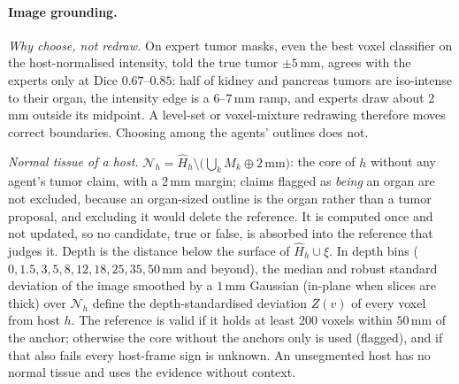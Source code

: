 \documentclass[fleqn,10pt]{olplainarticle}
\begin{document}
\paragraph{Image grounding.}
\label{sec:grounding_details}
\emph{Why choose, not redraw.} On expert tumor masks, even the best voxel classifier on the host-normalised intensity, told
the true tumor $\pm5$\,mm, agrees with the experts only at Dice $0.67$--$0.85$: half of kidney and pancreas tumors are
iso-intense to their organ, the intensity edge is a $6$--$7$\,mm ramp, and experts draw about $2$\,mm outside its midpoint.
A level-set or voxel-mixture redrawing therefore moves correct boundaries. Choosing among the agents' outlines does not.

\emph{Normal tissue of a host.} $\mathcal{N}_h=\hat H_h\setminus\bigl(\bigcup_k M_k\oplus2\,\mathrm{mm}\bigr)$: the core of
$h$ without any agent's tumor claim, with a $2$\,mm margin; claims flagged as \emph{being} an organ are not excluded, because an
organ-sized outline is the organ rather than a tumor proposal, and excluding it would delete the reference. It is computed once and not updated, so no candidate, true or
false, is absorbed into the reference that judges it. Depth is the distance below the surface of $\hat H_h\cup\xi$. In
depth bins ($0,1.5,3,5,8,12,18,25,35,50$\,mm and beyond), the median and robust standard deviation of the image smoothed by
a $1$\,mm Gaussian (in-plane when slices are thick) over $\mathcal{N}_h$ define the depth-standardised deviation $Z(v)$ of
every voxel from host $h$. The reference is valid if it holds at least $200$ voxels within $50$\,mm of the anchor; otherwise
the core without the anchors only is used (flagged), and if that also fails every host-frame sign is unknown. An
unsegmented host has no normal tissue and uses the evidence without context.
\end{document}
